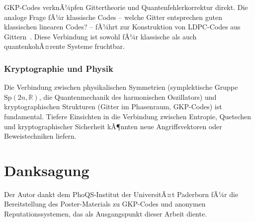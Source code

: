 ﻿\documentclass[a4paper,12pt]{article}
\theoremstyle{definition}
\newcommand{\R}{\mathbb{R}}
\begin{document}
GKP-Codes verknÃ¼pfen Gittertheorie und Quantenfehlerkorrektur direkt.
Die analoge Frage fÃ¼r klassische Codes -- welche Gitter entsprechen guten
klassischen linearen Codes? -- fÃ¼hrt zur Konstruktion von LDPC-Codes aus Gittern~\cite{Sipser1996}.
Diese Verbindung ist sowohl fÃ¼r klassische als auch quantenkohÃ¤rente Systeme fruchtbar.

\subsubsection{Kryptographie und Physik}

Die Verbindung zwischen physikalischen Symmetrien (symplektische Gruppe $\mathrm{Sp}(2n,\R)$,
die Quantenmechanik des harmonischen Oszillators) und kryptographischen Strukturen
(Gitter im Phasenraum, GKP-Codes) ist fundamental.
Tiefere Einsichten in die Verbindung zwischen Entropie, Quetschen und
kryptographischer Sicherheit kÃ¶nnten neue Angriffsvektoren oder Beweistechniken liefern.

\section*{Danksagung}

Der Autor dankt dem PhoQS-Institut der UniversitÃ¤t Paderborn fÃ¼r die
Bereitstellung des Poster-Materials zu GKP-Codes und anonymen Reputationssystemen,
das als Ausgangspunkt dieser Arbeit diente.
\end{document}

